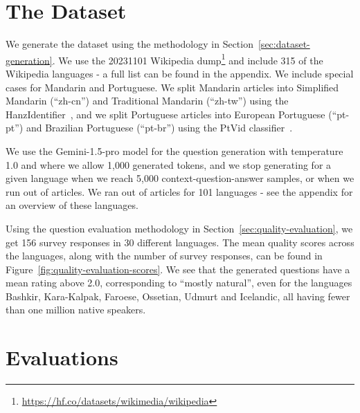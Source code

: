 \documentclass[10pt, a4paper]{article}
\begin{document}
\section{The Dataset}
\label{sec:the-dataset}

We generate the dataset using the methodology in Section~\ref{sec:dataset-generation}.
We use the 20231101 Wikipedia
dump\footnote{\url{https://hf.co/datasets/wikimedia/wikipedia}} and include 315 of the
Wikipedia languages - a full list can be found in the appendix. We include special cases
for Mandarin and Portuguese. We split Mandarin articles into Simplified Mandarin
(``zh-cn'') and Traditional Mandarin (``zh-tw'') using the
HanzIdentifier~\cite{tsroten2024hanzidentifier}, and we split Portuguese articles into
European Portuguese (``pt-pt'') and Brazilian Portuguese (``pt-br'') using the PtVid
classifier~.

We use the Gemini-1.5-pro model \cite{reid2024gemini} for the question generation with
temperature 1.0 and where we allow 1,000 generated tokens, and we stop generating for a
given language when we reach 5,000 context-question-answer samples, or when we run out
of articles. We ran out of articles for 101 languages - see the appendix for an overview
of these languages.

Using the question evaluation methodology in Section~\ref{sec:quality-evaluation}, we
get 156 survey responses in 30 different languages. The mean quality scores across the
languages, along with the number of survey responses, can be found in
Figure~\ref{fig:quality-evaluation-scores}. We see that the generated questions have a
mean rating above 2.0, corresponding to ``mostly natural'', even for the languages
Bashkir, Kara-Kalpak, Faroese, Ossetian, Udmurt and Icelandic, all having fewer than one
million native speakers.


\section{Evaluations}
\label{sec:evaluations}
\end{document}
